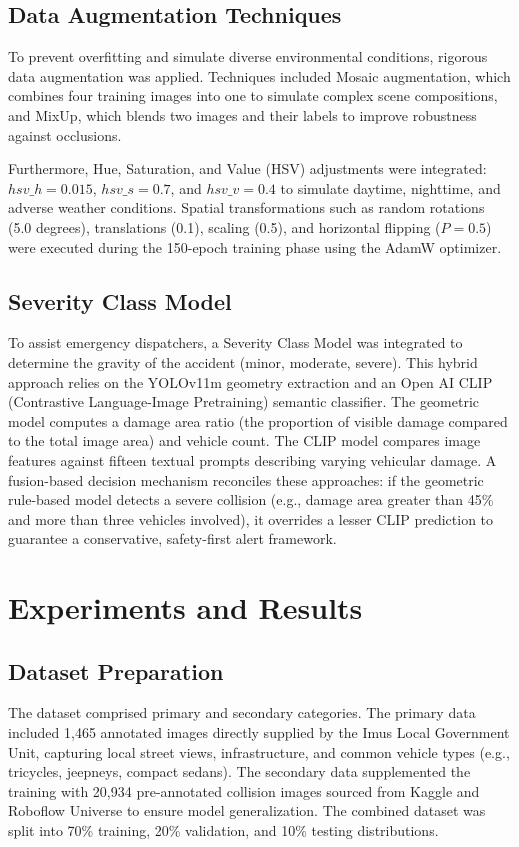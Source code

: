 \documentclass[conference]{IEEEtran}
\begin{document}
\subsection{Data Augmentation Techniques}
To prevent overfitting and simulate diverse environmental conditions, rigorous data augmentation was applied. Techniques included Mosaic augmentation, which combines four training images into one to simulate complex scene compositions, and MixUp, which blends two images and their labels to improve robustness against occlusions. 

Furthermore, Hue, Saturation, and Value (HSV) adjustments were integrated: $hsv\_h=0.015$, $hsv\_s=0.7$, and $hsv\_v=0.4$ to simulate daytime, nighttime, and adverse weather conditions. Spatial transformations such as random rotations (5.0 degrees), translations (0.1), scaling (0.5), and horizontal flipping ($P=0.5$) were executed during the 150-epoch training phase using the AdamW optimizer.

\subsection{Severity Class Model}
To assist emergency dispatchers, a Severity Class Model was integrated to determine the gravity of the accident (minor, moderate, severe). This hybrid approach relies on the YOLOv11m geometry extraction and an Open AI CLIP (Contrastive Language-Image Pretraining) semantic classifier. The geometric model computes a damage area ratio (the proportion of visible damage compared to the total image area) and vehicle count. The CLIP model compares image features against fifteen textual prompts describing varying vehicular damage. A fusion-based decision mechanism reconciles these approaches: if the geometric rule-based model detects a severe collision (e.g., damage area greater than 45\% and more than three vehicles involved), it overrides a lesser CLIP prediction to guarantee a conservative, safety-first alert framework.

\section{Experiments and Results}

\subsection{Dataset Preparation}
The dataset comprised primary and secondary categories. The primary data included 1,465 annotated images directly supplied by the Imus Local Government Unit, capturing local street views, infrastructure, and common vehicle types (e.g., tricycles, jeepneys, compact sedans). The secondary data supplemented the training with 20,934 pre-annotated collision images sourced from Kaggle and Roboflow Universe to ensure model generalization. The combined dataset was split into 70\% training, 20\% validation, and 10\% testing distributions. 
\end{document}
